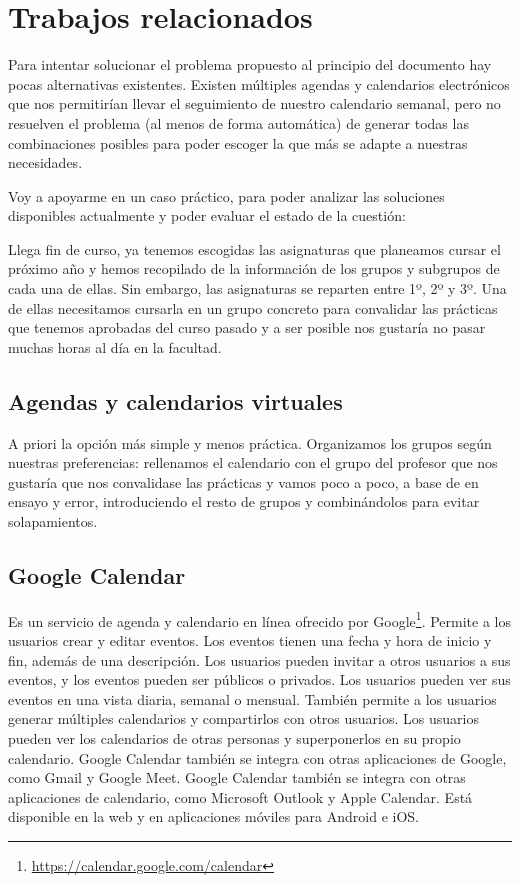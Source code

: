 \section{Trabajos relacionados}

Para intentar solucionar el problema propuesto al principio del documento hay pocas alternativas existentes. Existen múltiples agendas y calendarios electrónicos que nos permitirían llevar el seguimiento de nuestro calendario semanal, pero no resuelven el problema (al menos de forma automática) de generar todas las combinaciones posibles para poder escoger la que más se adapte a nuestras necesidades.\newline

Voy a apoyarme en un caso práctico, para poder analizar las soluciones disponibles actualmente y poder evaluar el estado de la cuestión:\newline

Llega fin de curso, ya tenemos escogidas las asignaturas que planeamos cursar el próximo año y hemos recopilado de la información de los grupos y subgrupos de cada una de ellas. Sin embargo, las asignaturas se reparten entre 1º, 2º y 3º. Una de ellas necesitamos cursarla en un grupo concreto para convalidar las prácticas que tenemos aprobadas del curso pasado y a ser posible nos gustaría no pasar muchas horas al día en la facultad.

\subsection{Agendas y calendarios virtuales}
A priori la opción más simple y menos práctica. Organizamos los grupos según nuestras preferencias: rellenamos el calendario con el grupo del profesor que nos gustaría que nos convalidase las prácticas y vamos poco a poco, a base de en ensayo y error, introduciendo el resto de grupos y combinándolos para evitar solapamientos.

\subsection{Google Calendar}
Es un servicio de agenda y calendario en línea ofrecido por Google\footnote{\url{https://calendar.google.com/calendar}}.  Permite a los usuarios crear y editar eventos. Los eventos tienen una fecha y hora de inicio y fin, además de una descripción. Los usuarios pueden invitar a otros usuarios a sus eventos, y los eventos pueden ser públicos o privados. Los usuarios pueden ver sus eventos en una vista diaria, semanal o mensual. También permite a los usuarios generar múltiples calendarios y compartirlos con otros usuarios. Los usuarios pueden ver los calendarios de otras personas y superponerlos en su propio calendario. Google Calendar también se integra con otras aplicaciones de Google, como Gmail y Google Meet. Google Calendar también se integra con otras aplicaciones de calendario, como Microsoft Outlook y Apple Calendar. Está disponible en la web y en aplicaciones móviles para Android e iOS.

